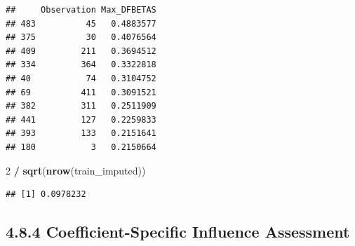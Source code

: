 \documentclass[
]{article}
\newenvironment{Shaded}{\begin{snugshade}}{\end{snugshade}}
\newcommand{\AttributeTok}[1]{\textcolor[rgb]{0.13,0.29,0.53}{#1}}
\newcommand{\DecValTok}[1]{\textcolor[rgb]{0.00,0.00,0.81}{#1}}
\newcommand{\FunctionTok}[1]{\textcolor[rgb]{0.13,0.29,0.53}{\textbf{#1}}}
\newcommand{\NormalTok}[1]{#1}
\newcommand{\OtherTok}[1]{\textcolor[rgb]{0.56,0.35,0.01}{#1}}
\newcommand{\SpecialCharTok}[1]{\textcolor[rgb]{0.81,0.36,0.00}{\textbf{#1}}}
\begin{document}
\begin{Shaded}
\end{Shaded}

\begin{verbatim}
##     Observation Max_DFBETAS
## 483          45   0.4883577
## 375          30   0.4076564
## 409         211   0.3694512
## 334         364   0.3322818
## 40           74   0.3104752
## 69          411   0.3091521
## 382         311   0.2511909
## 441         127   0.2259833
## 393         133   0.2151641
## 180           3   0.2150664
\end{verbatim}

\begin{Shaded}
\begin{Highlighting}[]
\DecValTok{2} \SpecialCharTok{/} \FunctionTok{sqrt}\NormalTok{(}\FunctionTok{nrow}\NormalTok{(train\_imputed))}
\end{Highlighting}
\end{Shaded}

\begin{verbatim}
## [1] 0.0978232
\end{verbatim}

\subsection{4.8.4 Coefficient-Specific Influence
Assessment}\label{coefficient-specific-influence-assessment}
\end{document}
